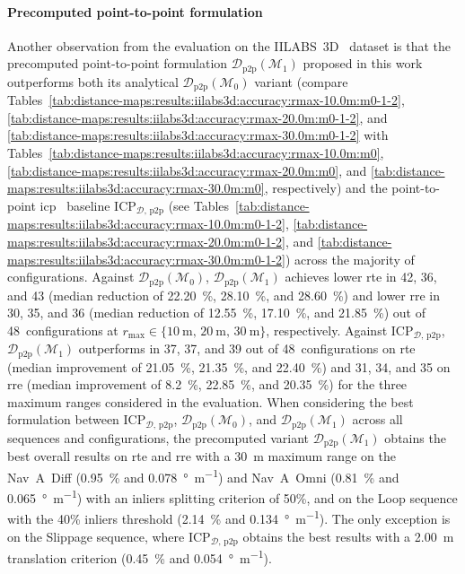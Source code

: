 \paragraph{Precomputed point-to-point formulation}
Another observation from the evaluation on the
IILABS~3D~\cite{ribeiro:access:2025} dataset is that the precomputed
point-to-point formulation $\mathcal{D}_\mathrm{p2p}(\mathcal{M}_1)$ proposed in
this work outperforms both its analytical
$\mathcal{D}_\mathrm{p2p}(\mathcal{M}_0)$ variant
(compare Tables~\ref{tab:distance-maps:results:iilabs3d:accuracy:rmax-10.0m:m0-1-2},
\ref{tab:distance-maps:results:iilabs3d:accuracy:rmax-20.0m:m0-1-2}, and
\ref{tab:distance-maps:results:iilabs3d:accuracy:rmax-30.0m:m0-1-2} with
Tables~\ref{tab:distance-maps:results:iilabs3d:accuracy:rmax-10.0m:m0},
\ref{tab:distance-maps:results:iilabs3d:accuracy:rmax-20.0m:m0}, and
\ref{tab:distance-maps:results:iilabs3d:accuracy:rmax-30.0m:m0}, respectively)
and the point-to-point \gls{icp}~\cite{besl-mckay:tpami:1992} baseline
$\mathrm{ICP}_{\mathcal{D},\,\mathrm{p2p}}$
(see Tables~\ref{tab:distance-maps:results:iilabs3d:accuracy:rmax-10.0m:m0-1-2},
\ref{tab:distance-maps:results:iilabs3d:accuracy:rmax-20.0m:m0-1-2}, and
\ref{tab:distance-maps:results:iilabs3d:accuracy:rmax-30.0m:m0-1-2}) across the
majority of configurations. Against $\mathcal{D}_\mathrm{p2p}(\mathcal{M}_0)$,
$\mathcal{D}_\mathrm{p2p}(\mathcal{M}_1)$ achieves lower \gls{rte} in
42, 36, and 43 (median reduction of \SI{22.20}{\percent}, \SI{28.10}{\percent},
and \SI{28.60}{\percent}) and lower \gls{rre} in 30, 35, and 36
(median reduction of \SI{12.55}{\percent}, \SI{17.10}{\percent}, and
\SI{21.85}{\percent}) out of 48~configurations at
$r_\mathrm{max} \in \{\SI{10}{\metre},\,\SI{20}{\metre},\,\SI{30}{\metre}\}$,
respectively. Against $\mathrm{ICP}_{\mathcal{D},\,\mathrm{p2p}}$,
$\mathcal{D}_\mathrm{p2p}(\mathcal{M}_1)$ outperforms in 37, 37, and 39
out of 48~configurations on \gls{rte} (median improvement of
\SI{21.05}{\percent}, \SI{21.35}{\percent}, and \SI{22.40}{\percent}) and
31, 34, and 35 on \gls{rre} (median improvement of \SI{8.2}{\percent},
\SI{22.85}{\percent}, and \SI{20.35}{\percent}) for the three maximum ranges
considered in the evaluation.
When considering the best formulation between
$\mathrm{ICP}_{\mathcal{D},\,\mathrm{p2p}}$,
$\mathcal{D}_\mathrm{p2p}(\mathcal{M}_0)$, and
$\mathcal{D}_\mathrm{p2p}(\mathcal{M}_1)$ across all sequences and
configurations, the precomputed variant
$\mathcal{D}_\mathrm{p2p}(\mathcal{M}_1)$ obtains the best overall results
on \gls{rte} and \gls{rre} with a \SI{30}{\metre} maximum range on the
Nav~A~Diff (\SI{0.95}{\percent} and \SI{0.078}{\degree\per\metre}) and
Nav~A~Omni (\SI{0.81}{\percent} and \SI{0.065}{\degree\per\metre}) with an
inliers splitting criterion of 50\%, and on the Loop sequence with  the 40\%
inliers threshold (\SI{2.14}{\percent} and \SI{0.134}{\degree\per\metre}).
The only exception is on the Slippage sequence,
where $\mathrm{ICP}_{\mathcal{D},\,\mathrm{p2p}}$ obtains the best results
with a \SI{2.00}{\metre} translation criterion
(\SI{0.45}{\percent} and \SI{0.054}{\degree\per\metre}).

